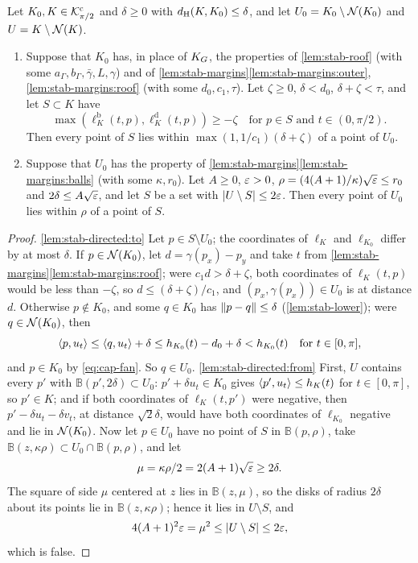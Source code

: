 \begin{lemma}\label{lem:stab-directed}
Let $K_0,K\in\mathcal{K}^{\mathrm{c}}_{\pi/2}$ and $\delta\ge0$ with $d_{\mathrm{H}}(K,K_0)\le\delta$, and let
$U_0=K_0\setminus\mathcal{N}(K_0)$ and $U=K\setminus\mathcal{N}(K)$.
\begin{enumerate}[label=(\alph*)]
\item\label{lem:stab-directed:to} Suppose that $K_0$ has, in place of $K_G$,
the properties of \cref{lem:stab-roof} (with some
$a_\Gamma,b_\Gamma,\bar\gamma,L,\gamma$) and of
\cref{lem:stab-margins}\ref{lem:stab-margins:outer},
\ref{lem:stab-margins:roof} (with some $d_0,c_1,\tau$). Let $\zeta\ge0$,
$\delta<d_0$, $\delta+\zeta<\tau$, and let $S\subset K$ have
\[
  \max(\ell^{\mathrm b}_K(t,p),\ell^{\mathrm d}_K(t,p))\ge-\zeta\quad
  \text{for $p\in S$ and $t\in(0,\pi/2)$}.
\]
Then every point of $S$ lies within $\max(1,1/c_1)(\delta+\zeta)$ of a point
of $U_0$.
\item\label{lem:stab-directed:from} Suppose that $U_0$ has the property of
\cref{lem:stab-margins}\ref{lem:stab-margins:balls} (with some $\kappa,r_0$).
Let $A\ge0$, $\varepsilon>0$, $\rho=(4(A+1)/\kappa)\sqrt{\varepsilon}\le r_0$ and
$2\delta\le A\sqrt{\varepsilon}$, and let $S$ be a set with
$\lvert U\setminus S\rvert\le2\varepsilon$. Then every point of $U_0$ lies within $\rho$ of a
point of $S$.
\end{enumerate}
\end{lemma}

\begin{proof}
\ref{lem:stab-directed:to} Let $p\in S\setminus U_0$; the coordinates of
$\ell_K$ and $\ell_{K_0}$ differ by at most $\delta$. If $p\in\mathcal{N}(K_0)$, let
$d=\gamma(p_x)-p_y$ and take $t$ from
\cref{lem:stab-margins}\ref{lem:stab-margins:roof}; were $c_1d>\delta+\zeta$,
both coordinates of $\ell_K(t,p)$ would be less than $-\zeta$, so
$d\le(\delta+\zeta)/c_1$, and $(p_x,\gamma(p_x))\in U_0$ is at distance $d$.
Otherwise $p\notin K_0$, and some $q\in K_0$ has $\lVert p-q\rVert\le\delta$
(\cref{lem:stab-lower}); were $q\in\mathcal{N}(K_0)$, then
\[
  \langle p,u_t\rangle\le\langle q,u_t\rangle+\delta\le h_{K_0}(t)-d_0+\delta<h_{K_0}(t)\quad
  \text{for }t\in[0,\pi],
\]
and $p\in K_0$ by \eqref{eq:cap-fan}. So $q\in U_0$.
\ref{lem:stab-directed:from} First, $U$ contains every $p'$ with
$\mathbb B(p',2\delta)\subset U_0$: $p'+\delta u_t\in K_0$ gives
$\langle p',u_t\rangle\le h_K(t)$ for $t\in[0,\pi]$, so $p'\in K$; and if both
coordinates of $\ell_K(t,p')$ were negative, then $p'-\delta u_t-\delta v_t$,
at distance $\sqrt2\delta$, would have both coordinates of $\ell_{K_0}$
negative and lie in $\mathcal{N}(K_0)$. Now let $p\in U_0$ have no point of $S$ in
$\mathbb B(p,\rho)$, take $\mathbb B(z,\kappa\rho)\subset U_0\cap\mathbb
B(p,\rho)$, and let
\[
  \mu=\kappa\rho/2=2(A+1)\sqrt{\varepsilon}\ge2\delta.
\]
The square of side $\mu$ centered at $z$ lies in $\mathbb B(z,\mu)$, so the
disks of radius $2\delta$ about its points lie in $\mathbb B(z,\kappa\rho)$;
hence it lies in $U\setminus S$, and
\[
  4(A+1)^2\varepsilon=\mu^2\le\lvert U\setminus S\rvert\le2\varepsilon,
\]
which is false.
\end{proof}

